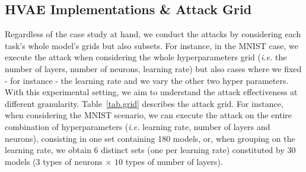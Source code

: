 \subsection{HVAE Implementations \& Attack Grid}\label{ssec.grid}
Regardless of the case study at hand, we conduct the attacks by considering each task's whole model's grids but also subsets. 
For instance, in the MNIST case, we execute the attack when considering the whole hyperparameters grid (\textit{i.e.} the number of layers, number of neurons, learning rate) but also cases where we fixed - for instance - the learning rate and we vary the other two hyper parameters. 
With this experimental setting, we aim to understand the attack effectiveness at different granularity. Table~\ref{tab.grid} describes the attack grid. 
For instance, when considering the MNIST scenario, we can execute the attack on the entire combination of hyperparameters (\textit{i.e.} learning rate, number of layers and neurons), consisting in one set containing 180 models, or, when grouping on the learning rate, we obtain 6 distinct sets (one per learning rate) constituted by 30 models ($3$ types of neurons $\times$ $10$ types of number of layers). 

